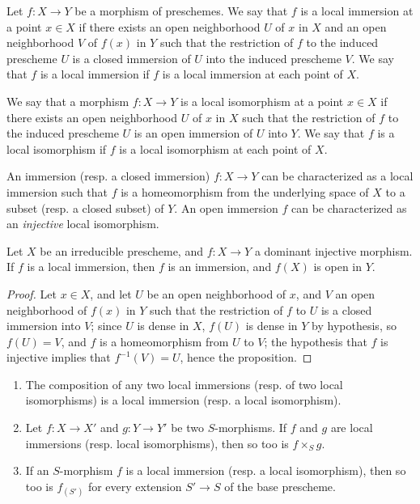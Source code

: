 \begin{defn}[4.5.1]
\label{1.4.5.1}
Let $f:X\to Y$ be a morphism of preschemes.
We say that $f$ is a local immersion at a point $x\in X$ if there exists an open neighborhood $U$ of $x$ in $X$ and an open neighborhood $V$ of $f(x)$ in $Y$ such that the restriction of $f$ to the induced prescheme $U$ is a closed immersion of $U$ into the induced prescheme $V$.
We say that $f$ is a local immersion if $f$ is a local immersion at each point of $X$.
\end{defn}

\begin{defn}[4.5.2]
\label{1.4.5.2}
We say that a morphism $f:X\to Y$ is a local isomorphism at
a point $x\in X$ if there exists an open neighborhood $U$ of $x$ in $X$ such that the restriction of $f$ to the induced prescheme $U$ is an open immersion of $U$ into $Y$.
We say that $f$ is a local isomorphism if $f$ is a local isomorphism at each point of $X$.
\end{defn}

\begin{env}[4.5.3]
\label{1.4.5.3}
An immersion (resp. a closed immersion) $f:X\to Y$ can be characterized as a local immersion such that $f$ is a homeomorphism from the underlying space of $X$ to a subset (resp. a closed subset) of $Y$.
An open immersion $f$ can be characterized as an \emph{injective} local isomorphism.
\end{env}

\begin{prop}[4.5.4]
\label{1.4.5.4}
Let $X$ be an irreducible prescheme, and $f:X\to Y$ a dominant injective morphism.
If $f$ is a local immersion, then $f$ is an immersion, and $f(X)$ is open in $Y$.
\end{prop}

\begin{proof}
\label{proof-1.4.5.4}
Let $x\in X$, and let $U$ be an open neighborhood of $x$, and $V$ an open neighborhood of $f(x)$ in $Y$ such that the restriction of $f$ to $U$ is a closed immersion into $V$;
since $U$ is dense in $X$, $f(U)$ is dense in $Y$ by hypothesis, so $f(U)=V$, and $f$ is a homeomorphism from $U$ to $V$;
the hypothesis that $f$ is injective implies that $f^{-1}(V)=U$, hence the proposition.
\end{proof}

\begin{prop}[4.5.5]
\label{1.4.5.5}
\medskip\noindent
\begin{enumerate}[label=\emph{(\roman*)}]
  \item The composition of any two local immersions (resp. of two local isomorphisms) is a local immersion (resp. a local isomorphism).
  \item Let $f:X\to X'$ and $g:Y\to Y'$ be two $S$-morphisms.
    If $f$ and $g$ are local immersions (resp. local isomorphisms), then so too is $f\times_S g$.
  \item If an $S$-morphism $f$ is a local immersion (resp. a local isomorphism), then so too is $f_{(S')}$ for every extension $S'\to S$ of the base prescheme.
\end{enumerate}
\end{prop}

